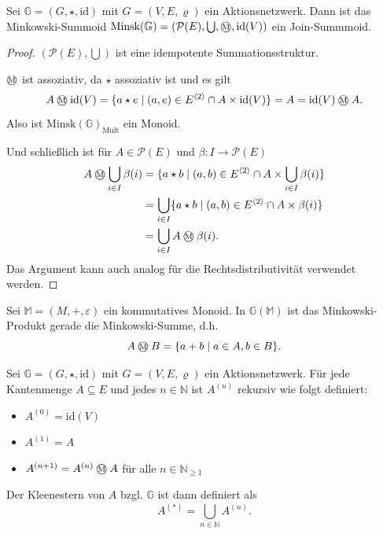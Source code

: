 \documentclass{article}
\newcommand{\mink}{\mathbin{
  \mathchoice
    {\mbox{\normalsize\textcircled{\scriptsize M}}}
    {\mbox{\normalsize\textcircled{\scriptsize M}}}
    {\mbox{\scriptsize\textcircled{\tiny M}}}
    {\mbox{\tiny\textcircled{\fontsize{3.5}{3.5}\selectfont M}}}
  }
}
\begin{document}
\begin{theorem}
  Sei $\mathbb{G} = (G, \star, \text{id})$ mit $G = (V, E, \varrho)$ ein Aktionsnetzwerk.
  Dann ist das Minkowski-Summoid $\text{Minsk}(\mathbb{G}) = (\mathcal{P}(E), \bigcup, \mink, \text{id}(V))$
  ein Join-Summmoid.
\end{theorem}
\begin{proof}
  $(\mathcal{P}(E), \bigcup)$ ist eine idempotente Summationsstruktur.
  
  $\mink$ ist assoziativ, da $\star$ assoziativ ist und es gilt
  \begin{equation*}
    A \mink \text{id}(V) 
    = \{a \star e \mid (a, e) \in E^{\langle 2 \rangle} \cap A \times \text{id}(V)\}
    = A
    = \text{id}(V) \mink A.
  \end{equation*}
  Also ist $\text{Minsk}(\mathbb{G})_\text{Mult}$ ein Monoid.

  Und schließlich ist für $A \in \mathcal{P}(E)$ und $\beta \colon I \to \mathcal{P}(E)$
  \begin{align*}
    A \mink \bigcup_{i \in I} \beta(i)
    &= \{a \star b \mid (a, b) \in E^{\langle 2 \rangle} \cap A \times \bigcup_{i \in I} \beta(i)\} \\
    &= \bigcup_{i \in I} \{a \star b \mid (a, b) \in E^{\langle 2 \rangle} \cap A \times \beta(i)\} \\
    &= \bigcup_{i \in I} A \mink \beta(i).
  \end{align*}
  Das Argument kann auch analog für die Rechtsdistributivität verwendet werden.
\end{proof}

\begin{example}
  Sei $\mathbb{M} = (M, +, \varepsilon)$ ein kommutatives Monoid.
  In $\mathbb{G}(\mathbb{M})$ ist das Minkowski-Produkt gerade die Minkowski-Summe,
  d.h.
  \begin{equation*}
    A \mink B = \{a + b \mid a \in A, b \in B\}.
  \end{equation*}
\end{example}

\begin{definition}
  Sei $\mathbb{G} = (G, \star, \text{id})$ mit $G = (V, E, \varrho)$ ein Aktionsnetzwerk.
  Für jede Kantenmenge $A \subseteq E$ und jedes $n \in \mathbb{N}$ ist $A^{(n)}$ rekursiv wie folgt definiert:
  \begin{itemize}
    \item $A^{(0)} = \text{id}(V)$
    \item $A^{(1)} = A$
    \item $A^{(n + 1)} = A^{(n)} \mink A$ für alle $n \in \mathbb{N}_{\geq 1}$
  \end{itemize}
  Der Kleenestern von $A$ bzgl. $\mathbb{G}$ ist dann definiert als
  \begin{equation*}
    A^{(\ast)} = \bigcup_{n \in \mathbb{N}} A^{(n)}.
  \end{equation*}
\end{definition}
\end{document}
